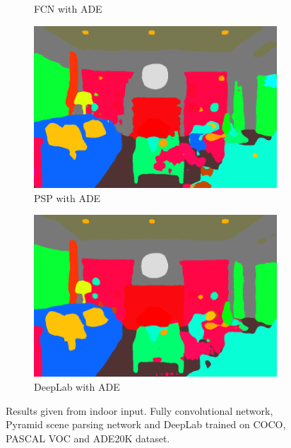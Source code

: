 \documentclass[12pt,a4paper,table,dvipsnames,tikz]{report}
\newcommand{\acronym}{\MakeUppercase}
\begin{document}
\begin{figure}[h!]
\begin{subfigure}[b]{0.3\textwidth}
			\caption{\acronym{fcn} with \acronym{ade}}
		\end{subfigure}
		\begin{subfigure}[b]{0.3\textwidth}
			\includegraphics[width=\textwidth]{in_ade_psp}
			\caption{\acronym{psp} with \acronym{ade}}
		\end{subfigure}
		\begin{subfigure}[b]{0.3\textwidth}
			\includegraphics[width=\textwidth]{in_ade_deep}
			\caption{DeepLab with \acronym{ade}}
		\end{subfigure}
		\caption{Results given from indoor input. Fully convolutional network, Pyramid 
			scene parsing network and DeepLab trained on \acronym{coco}, \acronym{pascal voc} 
			and \acronym{ade20k} dataset.}
		\label{fig:in}
	\end{figure}
	
\end{document}
